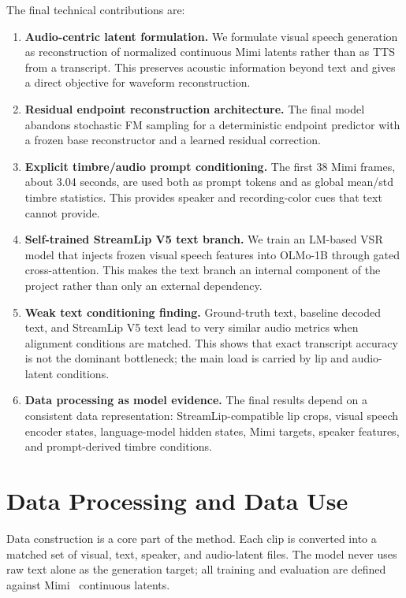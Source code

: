 \documentclass{article}
\begin{document}
The final technical contributions are:
\begin{enumerate}
    \item \textbf{Audio-centric latent formulation.} We formulate visual speech
    generation as reconstruction of normalized continuous Mimi latents rather
    than as TTS from a transcript. This preserves acoustic information beyond
    text and gives a direct objective for waveform reconstruction.
    \item \textbf{Residual endpoint reconstruction architecture.} The final
    model abandons stochastic FM sampling for a deterministic endpoint predictor
    with a frozen base reconstructor and a learned residual correction.
    \item \textbf{Explicit timbre/audio prompt conditioning.} The first 38 Mimi
    frames, about 3.04 seconds, are used both as prompt tokens and as global
    mean/std timbre statistics. This provides speaker and recording-color cues
    that text cannot provide.
    \item \textbf{Self-trained StreamLip V5 text branch.} We train an LM-based
    VSR model that injects frozen visual speech features into OLMo-1B through
    gated cross-attention. This makes the text branch an internal component of
    the project rather than only an external dependency.
    \item \textbf{Weak text conditioning finding.} Ground-truth text,
    baseline decoded text, and StreamLip V5 text lead to very similar audio
    metrics when alignment conditions are matched. This shows that exact
    transcript accuracy is not the dominant bottleneck; the main load is carried
    by lip and audio-latent conditions.
    \item \textbf{Data processing as model evidence.} The final results depend
    on a consistent data representation: StreamLip-compatible lip crops, visual
    speech encoder states, language-model hidden states, Mimi targets, speaker
    features, and prompt-derived timbre conditions.
\end{enumerate}

\section{Data Processing and Data Use}

Data construction is a core part of the method. Each clip is converted into a
matched set of visual, text, speaker, and audio-latent files. The model never
uses raw text alone as the generation target; all training and evaluation are
defined against Mimi~\cite{defossez2024moshi} continuous latents.
\end{document}
